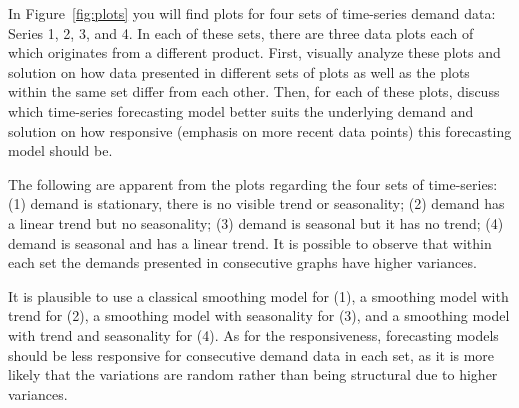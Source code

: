 \begin{question} \label{plots} 
In Figure~\ref{fig:plots} you will find plots for four sets of time-series demand data: Series 1, 2, 3, and 4. In each of these sets, there are three data plots each of which originates from a different product. First, visually analyze these plots and solution on how data presented in different sets of plots as well as the plots within the same set differ from each other. Then, for each of these plots, discuss which time-series forecasting model better suits the underlying demand and solution on how responsive (emphasis on more recent data points) this forecasting model should be.

\end{question}

  \begin{solution}
The following are apparent from the plots regarding the four sets of time-series: (1) demand is stationary, there is no visible trend or seasonality; (2) demand has a linear trend but no seasonality; (3) demand is seasonal but it has no trend; (4) demand is seasonal and has a linear trend. It is possible to observe that within each set the demands presented in consecutive graphs have higher variances. 

It is plausible to use a classical smoothing model for (1), a smoothing model with trend for (2), a smoothing model with seasonality for (3), and a smoothing model with trend and seasonality for (4). As for the responsiveness, forecasting models should be less responsive for consecutive demand data in each set, as it is more likely that the variations are random rather than being structural due to higher variances. 
  \end{solution}


%   










